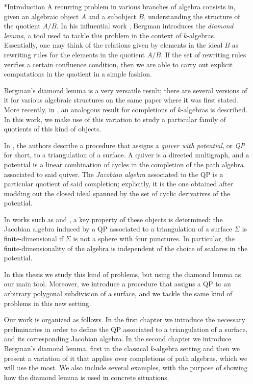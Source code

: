 \begin{chapter}*{Introduction}
A recurring problem in various branches of algebra consists in, given an algebraic object $A$ and a subobject $B$, understanding the structure of the quotient $A/B$. In his influential work \cite{Ber78}, Bergman introduces the \emph{diamond lemma}, a tool used to tackle this problem in the context of $k$-algebras. Essentially, one may think of the relations given by elements in the ideal $B$ as rewriting rules for the elements in the quotient $A/B$. If the set of rewriting rules verifies a certain confluence condition, then we are able to carry out explicit computations in the quotient in a simple fashion.

Bergman's diamond lemma is a very versatile result; there are several versions of it for various algebraic structures on the same paper where it was first stated. More recently, in \cite{SAV15}, an analogous result for completions of $k$-algebras is described. In this work, we make use of this variation to study a particular family of quotients of this kind of objects.

In \cite{DWZ08}, the authors describe a procedure that assigns a \emph{quiver with potential}, or \emph{QP} for short, to a triangulation of a surface. A quiver is a directed multigraph, and a potential is a linear combination of cycles in the completion of the path algebra associated to said quiver. The \emph{Jacobian algebra} associated to the QP is a particular quotient of said completion; explicitly, it is the one obtained after modding out the closed ideal spanned by the set of cyclic derivatives of the potential.

In works such as \cite{Lad12} and \cite{TVD12}, a key property of these objects is determined: the Jacobian algebra induced by a QP associated to a triangulation of a surface $\Sigma$ is finite-dimensional if $\Sigma$ is not a sphere with four punctures. In particular, the finite-dimensionality of the algebra is independent of the choice of scalares in the potential. 

In this thesis we study this kind of problems, but using the diamond lemma as our main tool. Moreover, we introduce a procedure that assigns a QP to an arbitrary polygonal subdivision of a surface, and we tackle the same kind of problems in this new setting.

Our work is organized as follows. In the first chapter we introduce the necessary preliminaries in order to define the QP associated to a triangulation of a surface, and its corresponding Jacobian algebra. In the second chapter we introduce Bergman's diamond lemma, first in the classical $k$-algebra setting and then we present a variation of it that applies over completions of path algebras, which we will use the most. We also include several examples, with the purpose of showing how the diamond lemma is used in concrete situations.


\end{chapter}
